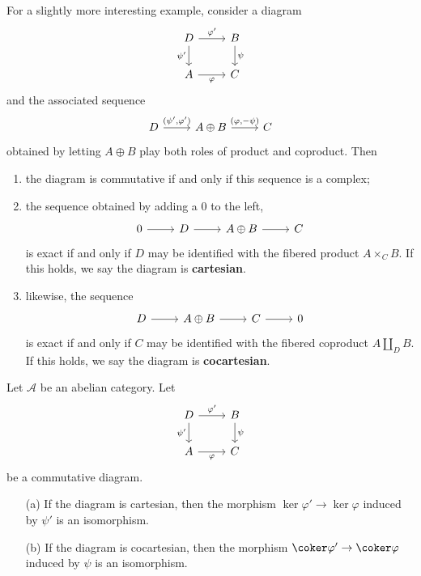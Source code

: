 \begin{example}\label{fibered diagram}
For a slightly more interesting example, consider a diagram
\[\begin{tikzcd}
D\ar[d,swap,"\psi'"]\ar[r,"\varphi'"]&B\ar[d,"\psi"]\\
A\ar[r,swap,"\varphi"]&C
\end{tikzcd}\]
and the associated sequence
\[\begin{tikzcd}
D\ar[r,"{(\psi',\varphi')}"]&A\oplus B\ar[r,"{(\varphi,-\psi)}"]&C
\end{tikzcd}\]
obtained by letting $A\oplus B$ play both roles of product and coproduct. Then
\begin{enumerate}
\item the diagram is commutative if and only if this sequence is a complex;
\item the sequence obtained by adding a $0$ to the left,
\[\begin{tikzcd}
0\ar[r]&D\ar[r]&A\oplus B\ar[r]&C
\end{tikzcd}\]
is exact if and only if $D$ may be identified with the fibered product $A\times_{C}B$. If this holds, we say the diagram is \textbf{cartesian}.
\item likewise, the sequence
\[\begin{tikzcd}
D\ar[r]&A\oplus B\ar[r]&C\ar[r]&0
\end{tikzcd}\]
is exact if and only if $C$ may be identified with the fibered coproduct $A\amalg_DB$. If this holds, we say the diagram is \textbf{cocartesian}.
\end{enumerate}
\end{example}
\begin{lemma}\label{pull bak lem}
Let $\mathcal{A}$ be an abelian category. Let
\[\begin{tikzcd}
D\ar[d,swap,"\psi'"]\ar[r,"\varphi'"]&B\ar[d,"\psi"]\\
A\ar[r,swap,"\varphi"]&C
\end{tikzcd}\]
be a commutative diagram.
\begin{enumerate}
\item[(a)] If the diagram is cartesian, then the morphism $\ker\varphi'\to\ker\varphi$ induced by $\psi'$ is an isomorphism.
\item[(b)] If the diagram is cocartesian, then the morphism $\coker\varphi'\to\coker\varphi$ induced by $\psi$ is an isomorphism.
\end{enumerate}
\end{lemma}
